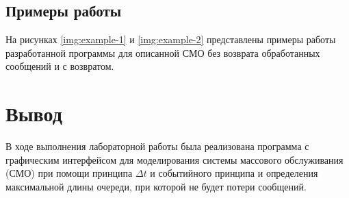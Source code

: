 \subsection*{Примеры работы}

На рисунках \ref{img:example-1} и \ref{img:example-2} представлены примеры работы разработанной программы для описанной СМО без возврата обработанных сообщений и с возвратом.



\section*{Вывод}

В ходе выполнения лабораторной работы была реализована программа с графическим интерфейсом для моделирования системы массового обслуживания (СМО) при помощи принципа $\Delta t$ и событийного принципа и определения максимальной длины очереди, при которой не будет потери сообщений. 


